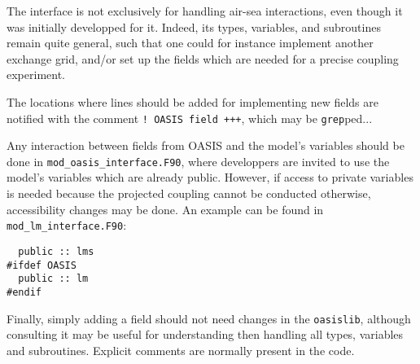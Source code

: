 The interface is not exclusively for handling air-sea interactions, even though it was
initially developped for it. Indeed, its types, variables, and subroutines remain quite
general, such that one could for instance implement another exchange grid, and/or set up
the fields which are needed for a precise coupling experiment.

The locations where lines should be added for implementing new fields are notified with
the comment \verb=! OASIS field +++=, which may be \verb=grep=ped...

Any interaction between fields from OASIS and the model's variables should be done in 
\verb=mod_oasis_interface.F90=, where developpers are invited to use the model's variables
which are already public. However, if access to private variables is needed because
the projected coupling cannot be conducted otherwise, accessibility changes may be done.
An example can be found in \verb=mod_lm_interface.F90=:
\begin{verbatim}
  public :: lms
#ifdef OASIS
  public :: lm
#endif
\end{verbatim}

Finally, simply adding a field should not need changes in the \verb=oasislib=, although
consulting it may be useful for understanding then handling all types, variables and
subroutines. Explicit comments are normally present in the code.
